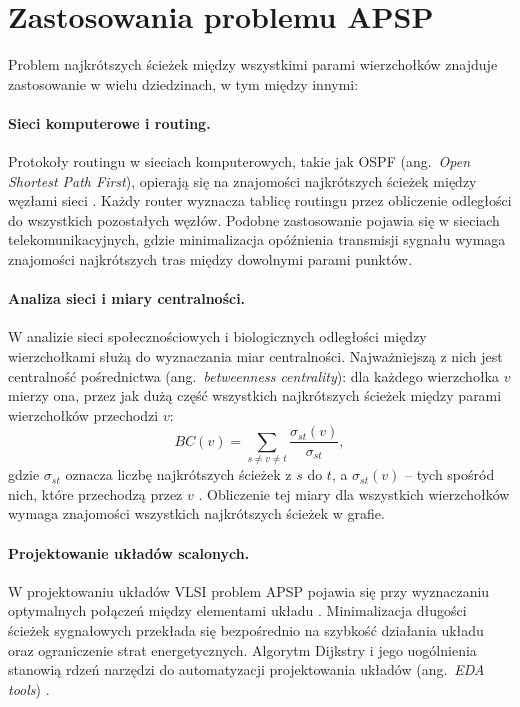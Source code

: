 \section{Zastosowania problemu APSP}

Problem najkrótszych ścieżek między wszystkimi parami wierzchołków znajduje zastosowanie w wielu dziedzinach, w tym między innymi:

\paragraph{Sieci komputerowe i routing.}
Protokoły routingu w sieciach komputerowych, takie jak OSPF
(ang.\ \emph{Open Shortest Path First}), opierają się na znajomości
najkrótszych ścieżek między węzłami sieci \cite{Reddy2016}.
Każdy router wyznacza tablicę routingu przez obliczenie odległości
do wszystkich pozostałych węzłów.
Podobne zastosowanie pojawia się w sieciach telekomunikacyjnych,
gdzie minimalizacja opóźnienia transmisji sygnału wymaga znajomości
najkrótszych tras między dowolnymi parami punktów.

\paragraph{Analiza sieci i miary centralności.}
W analizie sieci społecznościowych i biologicznych odległości
między wierzchołkami służą do wyznaczania miar centralności.
Najważniejszą z nich jest centralność pośrednictwa
(ang.\ \emph{betweenness centrality}): dla każdego wierzchołka $v$
mierzy ona, przez jak dużą część wszystkich najkrótszych ścieżek
między parami wierzchołków przechodzi $v$:
\[
BC(v) = \sum_{s \neq v \neq t} \frac{\sigma_{st}(v)}{\sigma_{st}},
\]
gdzie $\sigma_{st}$ oznacza liczbę najkrótszych ścieżek
z $s$ do $t$, a $\sigma_{st}(v)$ -- tych spośród nich,
które przechodzą przez $v$ \cite{Brandes2001}.
Obliczenie tej miary dla wszystkich wierzchołków wymaga
znajomości wszystkich najkrótszych ścieżek w grafie.

\paragraph{Projektowanie układów scalonych.}
W projektowaniu układów VLSI problem APSP pojawia się przy
wyznaczaniu optymalnych połączeń między elementami układu
\cite{Peyer2009}. Minimalizacja długości ścieżek sygnałowych
przekłada się bezpośrednio na szybkość działania układu
oraz ograniczenie strat energetycznych. Algorytm Dijkstry
i jego uogólnienia stanowią rdzeń narzędzi do automatyzacji
projektowania układów (ang.\ \emph{EDA tools}) \cite{Peyer2009}.

